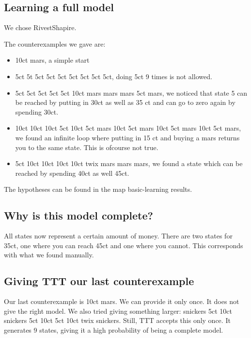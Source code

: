 \documentclass[11pt,a4paper]{article}
\begin{document}
\subsection{Learning a full model}
We chose RivestShapire. 

The counterexamples we gave are:
\begin{itemize}
	\item 10ct mars, a simple start
	\item 5ct 5t 5ct 5ct 5ct 5ct 5ct 5ct 5ct, doing 5ct 9 times is not allowed.
	\item 5ct 5ct 5ct 5ct 5ct 10ct mars mars mars 5ct mars, we noticed that state 5 can be reached by putting in 30ct as well as 35 ct and can go to zero again by spending 30ct.
	\item 10ct 10ct 10ct 5ct 10ct 5ct mars 10ct 5ct mars 10ct 5ct mars 10ct 5ct mars, we found an infinite loop where putting in 15 ct and buying a mars returns you to the same state. This is ofcourse not true.
	\item 5ct 10ct 10ct 10ct 10ct twix mars mars mars, we found a state which can be reached by spending 40ct as well 45ct. 
\end{itemize}

The hypotheses can be found in the map basic-learning results.

\subsection{Why is this model complete?}
All states now represent a certain amount of money. There are two states for 35ct, one where you can reach 45ct and one where you cannot. This corresponds with what we found manually.




\subsection{Giving TTT our last counterexample}
Our last counterexample is 10ct mars. We can provide it only once. It does not give the right model.
We also tried giving something larger: snickers 5ct 10ct snickers 5ct 10ct 5ct 10ct twix snickers.
Still, TTT accepts this only once. It generates 9 states, giving it a high probability of being a complete model.
\end{document}

